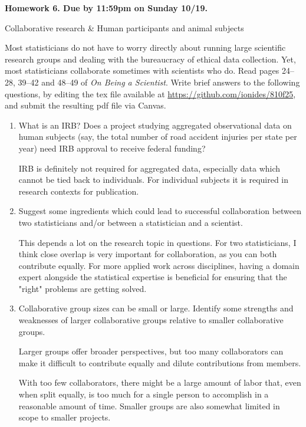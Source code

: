 \documentclass[12pt]{article}
\begin{document}
\begin{center}\bf
Homework 6. Due by 11:59pm on Sunday 10/19.

Collaborative research \& Human participants and animal subjects

\end{center}
Most statisticians do not have to worry directly about running large scientific research groups and dealing with the bureaucracy of ethical data collection. Yet, most statisticians collaborate sometimes with scientists who do. Read pages 24--28, 39--42 and 48--49 of {\em On Being a Scientist}.  Write brief answers to the following questions, by editing the tex file available at \url{https://github.com/ionides/810f25}, and submit the resulting pdf file via Canvas.

\begin{enumerate}

\item What is an IRB? Does a project studying aggregated observational data on human subjects (say, the total number of road accident injuries per state per year) need IRB approval to receive federal funding?

IRB is definitely not required for aggregated data, especially data which cannot be tied back 
to individuals. For individual subjects it is required in research contexts for publication.

\item Suggest some ingredients which could lead to successful collaboration between two statisticians and/or between a statistician and a scientist.

This depends a lot on the research topic in questions. For two statisticians, I think close overlap
is very important for collaboration, as you can both contribute equally. For more applied work across
disciplines, having a domain expert alongside the statistical expertise is beneficial for ensuring
that the "right" problems are getting solved.

\item Collaborative group sizes can be small or large. Identify some strengths and weaknesses of larger collaborative groups relative to smaller collaborative groups.

Larger groups offer broader perspectives, but too many collaborators can make it difficult to contribute equally and dilute contributions from members. 

With too few collaborators, there might be a large amount of labor that, even when split equally, is
too much for a single person to accomplish in a reasonable amount of time. Smaller groups are also 
somewhat limited in scope to smaller projects.


\end{enumerate}
\end{document}
